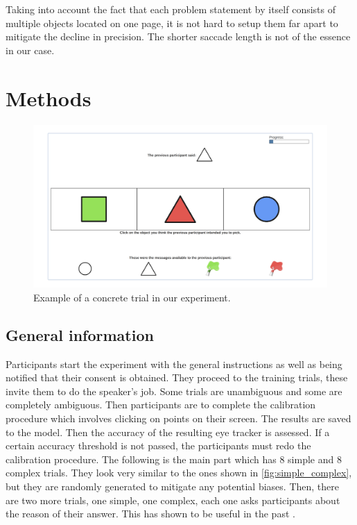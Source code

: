 \documentclass[11pt,a4paper]{article}
\begin{document}
Taking into account the fact that each problem statement by itself consists of multiple objects located on one page, it is not hard to setup them far apart to mitigate the decline in precision. The shorter saccade length is not of the essence in our case.

\section{Methods}

\begin{figure}
    \centering
    \includegraphics[width=1\linewidth]{images/layout.png}
    \caption{Example of a concrete trial in our experiment.}
    \label{fig:layout}
\end{figure}
\subsection{General information}
Participants start the experiment with the general instructions as well as being notified that their consent is obtained. They proceed to the training trials, these invite them to do the speaker's job. Some trials are unambiguous and some are completely ambiguous. Then participants are to complete the calibration procedure which involves clicking on points on their screen. The results are saved to the model. Then the accuracy of the resulting eye tracker is assessed. If a certain accuracy threshold is not passed, the participants must redo the calibration procedure. The following is the main part which has 8 simple and 8 complex trials. They look very similar to the ones shown in \autoref{fig:simple_complex}, but they are randomly generated to mitigate any potential biases. Then, there are two more trials, one simple, one complex, each one asks participants about the reason of their answer. This has shown to be useful in the past \citep{Mayn_2023}.  
\end{document}
